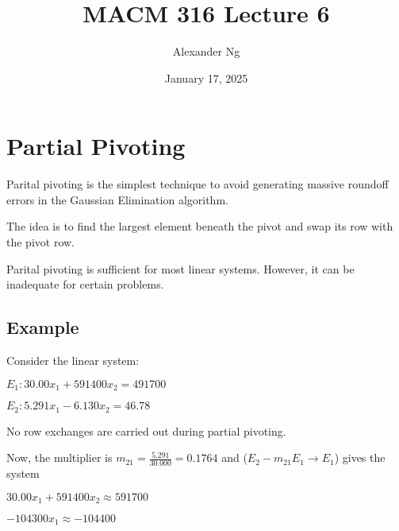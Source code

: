 \documentclass[12pt]{article}
\begin{document}
\renewcommand{\arraystretch}{1.25} %
\setlength{\arraycolsep}{12pt}

\title{MACM 316 Lecture 6}
\author{Alexander Ng}
\date{January 17, 2025}

\maketitle

\section{Partial Pivoting}

Parital pivoting is the simplest technique to avoid generating massive roundoff
errors in the Gaussian Elimination algorithm.

The idea is to find the largest element beneath the pivot and swap its row with
the pivot row.

Parital pivoting is sufficient for most linear systems. However, it can be
inadequate for certain problems.

\subsection{Example}

Consider the linear system:

\quad $E_1: 30.00x_1 + 591400x_2 = 491700$

\quad $E_2: 5.291x_1 - 6.130x_2 = 46.78$

No row exchanges are carried out during partial pivoting.

Now, the multiplier is $m_{21} = \frac{5.291}{30.000} = 0.1764$ and 
($E_2-m_{21}E_1 \to E_1$) gives the system

\quad $30.00x_1 + 591400x_2 \approx 591700$

\quad $-104300x_1 \approx -104400$
\end{document}
